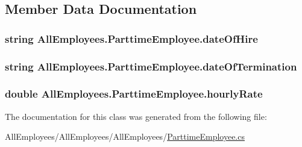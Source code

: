 \subsection{Member Data Documentation}
\hypertarget{class_all_employees_1_1_parttime_employee_ae9d23e6b09dc7c227d1b2bc3d7d0bfbb}{}
\subsubsection[{date\+Of\+Hire}]{\setlength{\rightskip}{0pt plus 5cm}string All\+Employees.\+Parttime\+Employee.\+date\+Of\+Hire}\label{class_all_employees_1_1_parttime_employee_ae9d23e6b09dc7c227d1b2bc3d7d0bfbb}
\hypertarget{class_all_employees_1_1_parttime_employee_a7d8454cf20373d6ff757afb4d8502158}{}
\subsubsection[{date\+Of\+Termination}]{\setlength{\rightskip}{0pt plus 5cm}string All\+Employees.\+Parttime\+Employee.\+date\+Of\+Termination}\label{class_all_employees_1_1_parttime_employee_a7d8454cf20373d6ff757afb4d8502158}
\hypertarget{class_all_employees_1_1_parttime_employee_a43bf804ba70f049a02ce73f2a65ff212}{}
\subsubsection[{hourly\+Rate}]{\setlength{\rightskip}{0pt plus 5cm}double All\+Employees.\+Parttime\+Employee.\+hourly\+Rate}\label{class_all_employees_1_1_parttime_employee_a43bf804ba70f049a02ce73f2a65ff212}


The documentation for this class was generated from the following file\+:\begin{DoxyCompactItemize}
\item 
All\+Employees/\+All\+Employees/\+All\+Employees/\hyperlink{_parttime_employee_8cs}{Parttime\+Employee.\+cs}\end{DoxyCompactItemize}
